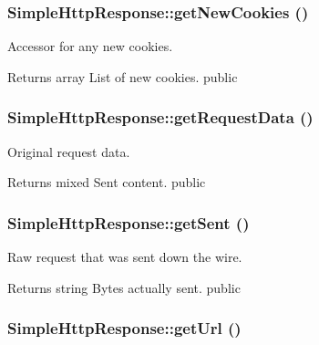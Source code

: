 \hypertarget{class_simple_http_response_a20d75659a803bc420d702951e0435a1d}{
\subsubsection[{getNewCookies}]{\setlength{\rightskip}{0pt plus 5cm}SimpleHttpResponse::getNewCookies ()}}
\label{class_simple_http_response_a20d75659a803bc420d702951e0435a1d}
Accessor for any new cookies. \begin{DoxyReturn}{Returns}
array List of new cookies.  public 
\end{DoxyReturn}
\hypertarget{class_simple_http_response_a235dd94a72d35d5c61098fc9625baf72}{
\subsubsection[{getRequestData}]{\setlength{\rightskip}{0pt plus 5cm}SimpleHttpResponse::getRequestData ()}}
\label{class_simple_http_response_a235dd94a72d35d5c61098fc9625baf72}
Original request data. \begin{DoxyReturn}{Returns}
mixed Sent content.  public 
\end{DoxyReturn}
\hypertarget{class_simple_http_response_a91e656519057e83140787b521cae9a56}{
\subsubsection[{getSent}]{\setlength{\rightskip}{0pt plus 5cm}SimpleHttpResponse::getSent ()}}
\label{class_simple_http_response_a91e656519057e83140787b521cae9a56}
Raw request that was sent down the wire. \begin{DoxyReturn}{Returns}
string Bytes actually sent.  public 
\end{DoxyReturn}
\hypertarget{class_simple_http_response_a2241dc18405a1f831af92943df1104ed}{
\subsubsection[{getUrl}]{\setlength{\rightskip}{0pt plus 5cm}SimpleHttpResponse::getUrl ()}}
